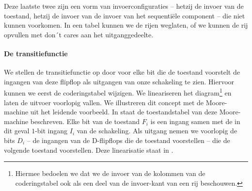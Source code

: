 Deze laatste twee zijn een vorm van invoerconfiguraties -- hetzij de invoer van de toestand, hetzij de invoer van de invoer van het sequenti\"ele component -- die niet kunnen voorkomen. In een tabel kunnen we de rijen weglaten, of we kunnen de rij opvullen met don´t cares aan het uitganggedeelte.

\paragraph{De transitiefunctie}
We stellen de transitiefunctie op door voor elke bit die de toestand voorstelt de ingangen van deze flipflop als uitgangen van onze schakeling te zien. Hiervoor kunnen we eerst de coderingstabel wijzigen. We lineariseren het diagram\footnote{Hiermee bedoelen we dat we de invoer van de kolommen van de coderingstabel ook als een deel van de invoer-kant van een rij beschouwen.} en laten de uitvoer voorlopig vallen. We illustreren dit concept met de Moore-machine uit het leidende voorbeeld. In  staat de toestandstabel van deze Moore-machine beschreven. Elke bit van de toestand $F_i$ is een ingang samen met de in dit geval $1$-bit ingang $I_i$ van de schakeling. Als uitgang nemen we voorlopig de bits $D_i$ -- de ingangen van de D-flipflops die de toestand voorstellen -- die de volgende toestand voorstellen. Deze linearisatie staat in .

